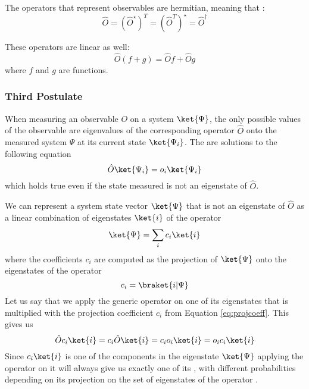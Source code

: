 \documentclass[../master_thesis.tex]{subfiles}
\begin{document}
The operators that represent observables are hermitian, meaning that
\cite{Cohen:1973}:
\begin{equation}
  \hat{O} = (\hat{O}^{\star})^T = (\hat{O}^T)^{\star} = \hat{O}^{\dagger}
\end{equation}

These operators are linear as well:
\begin{equation}
    \hat{O}(f + g) = \hat{O}f + \hat{O}g\label{eq:oplinearity}
\end{equation}
where $f$ and $g$ are functions.

\subsubsection{Third Postulate}
When measuring an observable $O$ on a system $\ket{\Psi}$, the only possible
values of the observable are eigenvalues of the corresponding operator $\hat{O}$
onto the measured system $\Psi$ at its current state $\ket{\Psi_i}$. The \eivals
are solutions to the following equation \cite{Cohen:1973}
\begin{equation}
  \hat{O}\ket{\Psi_i} = o_i \ket{\Psi_i}
\end{equation}
which holds true even if the state measured is not an eigenstate of $\hat{O}$.

We can represent a system state vector $\ket{\Psi}$ that is not an eigenstate
of $\hat{O}$ as a linear combination of eigenstates $\ket{i}$ of the operator
\begin{equation}
  \ket{\Psi} = \sum_i c_i \ket{i}
\end{equation}
where the coefficients $c_i$ are computed as the projection of $\ket{\Psi}$ onto
the eigenstates of the operator
\begin{equation}\label{eq:projcoeff}
  c_i = \braket{i|\Psi}
\end{equation}
Let us say that we apply the generic operator on one of its eigenstates that
is multiplied with the projection coefficient $c_i$ from Equation \ref{eq:projcoeff}.
This gives us
\begin{equation}
  \hat{O}c_i\ket{i} = c_i\hat{O}\ket{i} = c_i o_i\ket{i} = o_i c_i\ket{i}
\end{equation}
Since $c_i\ket{i}$ is one of the components in the eigenstate $\ket{\Psi}$
applying the operator on it will always give us exactly one of its \eivals, with
different probabilities  depending on its projection on the set of eigenstates
of the operator \cite{Cohen:1973}.
\end{document}
